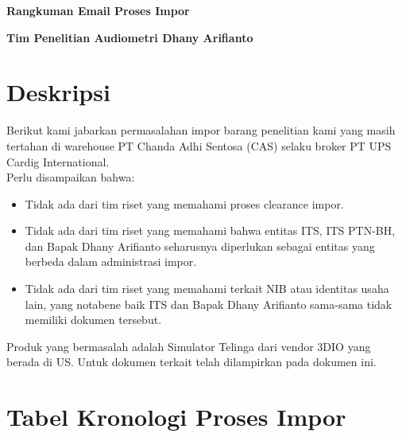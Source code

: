 \documentclass{article} %
\begin{document}
	\begin{titlepage}
		
		\centering %
		
		{
			\LARGE %
			\bf %
			Rangkuman Email Proses Impor
		}
		
		\bigskip
		{\Large \bf Tim Penelitian Audiometri Dhany Arifianto}
		\vfill %
	\end{titlepage}

	\newpage
	\section{Deskripsi}
	
	Berikut kami jabarkan permasalahan impor barang penelitian kami yang masih tertahan di warehouse PT Chanda Adhi Sentosa (CAS) selaku broker PT UPS Cardig International.\\
	
	Perlu disampaikan bahwa:
	\begin{itemize}
		\item Tidak ada dari tim riset yang memahami proses clearance impor.
		\item Tidak ada dari tim riset yang memahami bahwa entitas ITS, ITS PTN-BH, dan Bapak Dhany Arifianto seharusnya diperlukan sebagai entitas yang berbeda dalam administrasi impor.
		\item Tidak ada dari tim riset yang memahami terkait NIB atau identitas usaha lain, yang notabene baik ITS dan Bapak Dhany Arifianto sama-sama tidak memiliki dokumen tersebut. 
	\end{itemize}

	Produk yang bermasalah adalah Simulator Telinga dari vendor 3DIO yang berada di US.
	Untuk dokumen terkait telah dilampirkan pada dokumen ini.
	
	\section{Tabel Kronologi Proses Impor}
	
\end{document}
